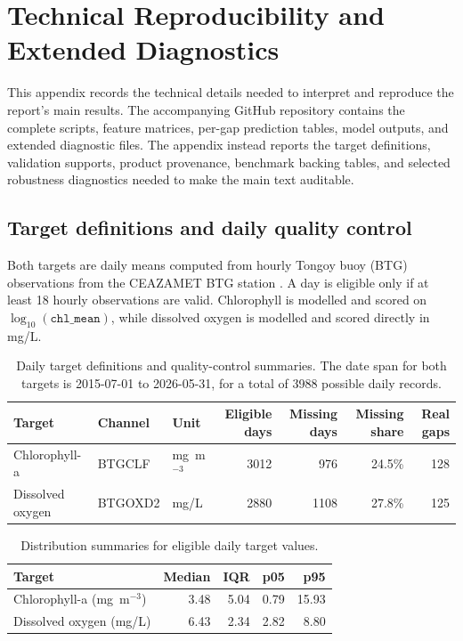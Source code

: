 \section{Technical Reproducibility and Extended Diagnostics}
\label{sec:appendix_repro}

This appendix records the technical details needed to interpret and reproduce the report's main
results. The accompanying GitHub repository \citep{faverio2026coastal_gap_repository} contains the
complete scripts, feature matrices, per-gap prediction tables, model outputs, and extended diagnostic
files. The appendix instead reports the target definitions, validation supports, product provenance,
benchmark backing tables, and selected robustness diagnostics needed to make the main text auditable.

\subsection{Target definitions and daily quality control}
\label{app:targets_qc}

Both targets are daily means computed from hourly Tongoy buoy (BTG) observations from the CEAZAMET
BTG station \citep{ceazamet_btg_station}. A day is eligible only if at least 18 hourly observations
are valid. Chlorophyll is modelled and scored on $\log_{10}(\texttt{chl\_mean})$, while dissolved
oxygen is modelled and scored directly in mg/L.

\begin{table}[h]
  \centering
  \small
  \caption{Daily target definitions and quality-control summaries. The date span for both targets
  is 2015-07-01 to 2026-05-31, for a total of 3988 possible daily records.}
  \label{tab:appendix_target_qc}
  \begin{tabularx}{\textwidth}{@{}l l l r r r r@{}}
    \toprule
    Target & Channel & Unit & Eligible days & Missing days & Missing share & Real gaps \\
    \midrule
    Chlorophyll-a
    & BTGCLF
    & mg~m$^{-3}$
    & 3012
    & 976
    & 24.5\%
    & 128 \\

    Dissolved oxygen
    & BTGOXD2
    & mg/L
    & 2880
    & 1108
    & 27.8\%
    & 125 \\
    \bottomrule
  \end{tabularx}
\end{table}

\begin{table}[h]
  \centering
  \small
  \caption{Distribution summaries for eligible daily target values.}
  \label{tab:appendix_target_distributions}
  \begin{tabular}{l r r r r}
    \toprule
    Target & Median & IQR & p05 & p95 \\
    \midrule
    Chlorophyll-a (mg~m$^{-3}$)
    & 3.48 & 5.04 & 0.79 & 15.93 \\

    Dissolved oxygen (mg/L)
    & 6.43 & 2.34 & 2.82 & 8.80 \\
    \bottomrule
  \end{tabular}
\end{table}

